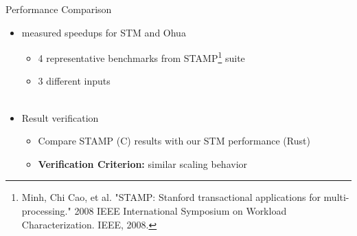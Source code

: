 \documentclass[aspectratio=169, usenames, dvipsnames]{beamer}
\begin{document}
\begin{frame}{Performance Comparison}
    \begin{itemize}
        \item measured speedups for STM and Ohua
            \begin{itemize}
                \item<2-> 4 representative benchmarks from STAMP\footnote[3]{Minh, Chi Cao, et al. "STAMP: Stanford transactional applications for multi-processing." 2008 IEEE International Symposium on Workload Characterization. IEEE, 2008.} suite
                \item<3-> 3 different inputs\\ \ 
            \end{itemize}
        \item<4-> Result verification
            \begin{itemize}
                \item<4-> Compare STAMP (C) results with our STM performance (Rust)
                \item<5-> \textbf{Verification Criterion:} similar scaling behavior
            \end{itemize}
        \end{itemize}
\end{frame}
\end{document}
